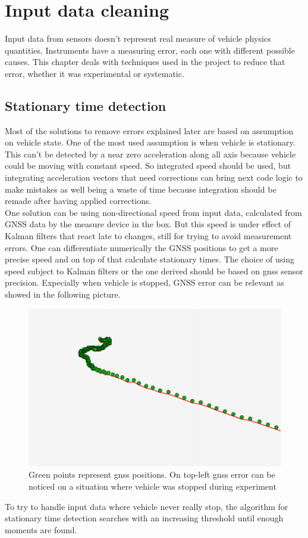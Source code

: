 \chapter{Input data cleaning}
\label{chap:input_data_cleaning}

Input data from sensors doesn't represent real measure of vehicle physics quantities. Instruments have a measuring error, each one with different possible causes. This chapter deals with techniques used in the project to reduce that error, whether it was experimental or systematic.

\section{Stationary time detection}
Most of the solutions to remove errors explained later are based on assumption on vehicle state. One of the most used assumption is when vehicle is stationary. \\
This can't be detected by a near zero acceleration along all axis because vehicle could be moving with constant speed. So integrated speed should be used, but integrating acceleration vectors that need corrections can bring next code logic to make mistakes as well being a waste of time because integration should be remade after having applied corrections. \\
One solution can be using non-directional speed from input data, calculated from GNSS data by the measure device in the box. But this speed is under effect of Kalman filters that react late to changes, still for trying to avoid measurement errors. One can differentiate numerically the GNSS positions to get a more precise speed and on top of that calculate stationary times. The choice of using speed subject to Kalman filters or the one derived should be based on gnss sensor precision. Expecially when vehicle is stopped, GNSS error can be relevant as showed in the following picture.
\begin{figure}[H]
\includegraphics[width=\textwidth]{gnss_error_stationary_vehicle}
\caption{Green points represent gnss positions. On top-left gnss error can be noticed on a situation where vehicle was stopped during experiment}
\end{figure}
To try to handle input data where vehicle never really stop, the algorithm for stationary time detection searches with an increasing threshold until enough moments are found.


